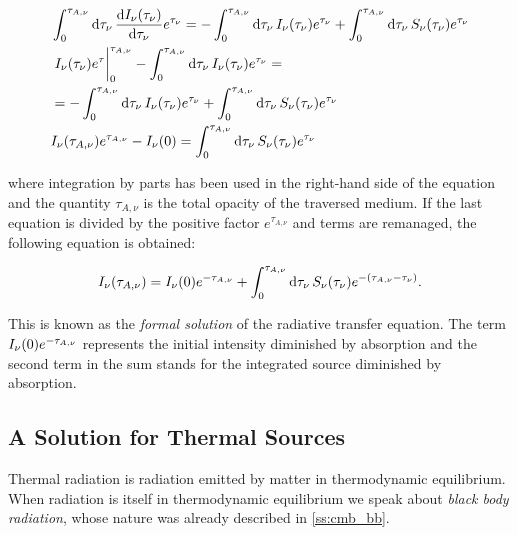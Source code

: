 \begin{equation}
        \begin{split}
                & \int^{\tau_{A,\nu}}_0 \dd{\tau_\nu}
                \dv{I_\nu\qty(\tau_\nu)}{\tau_\nu} e^{\tau_\nu} =
                -\int^{\tau_{A,\nu}}_0 \dd{\tau_\nu}
                I_\nu\qty(\tau_\nu) e^{\tau_\nu} +
                \int^{\tau_{A,\nu}}_0 \dd{\tau_\nu}
                S_\nu\qty(\tau_\nu) e^{\tau_\nu} \\
                & \eval{I_\nu\qty(\tau_\nu) e^\tau}^{\tau_{A,\nu}}_0
                -\int^{\tau_{A,\nu}}_0 \dd{\tau_\nu}
                I_\nu\qty(\tau_\nu) e^{\tau_\nu} = \\
                & = -\int^{\tau_{A,\nu}}_0 \dd{\tau_\nu}
                I_\nu\qty(\tau_\nu) e^{\tau_\nu} +
                \int^{\tau_{A,\nu}}_0 \dd{\tau_\nu}
                S_\nu\qty(\tau_\nu) e^{\tau_\nu} \\
                & I_\nu\qty(\tau_{A,\nu}) e^{\tau_{A,\nu}} -I_\nu\qty(0) =
                \int^{\tau_{A,\nu}}_0 \dd{\tau_\nu}
                S_\nu\qty(\tau_\nu) e^{\tau_\nu}
        \end{split}
\end{equation}

where integration by parts has been used in the right-hand side of the
equation and the quantity $\tau_{A,\nu}$ is the total opacity of the
traversed medium. If the last equation is divided by the positive factor
$e^{\tau_{A,\nu}}$ and terms are remanaged, the following equation is
obtained:

\begin{equation}
        I_\nu\qty(\tau_{A,\nu}) = I_\nu\qty(0) e^{-\tau_{A,\nu}} +
        \int^{\tau_{A,\nu}}_0 \dd{\tau_\nu}
        S_\nu\qty(\tau_\nu) e^{-\qty(\tau_{A,\nu} - \tau_\nu)}.
\end{equation}

This is known as the \emph{formal solution} of the radiative transfer
equation. The term $I_\nu\qty(0) e^{-\tau_{A,\nu}}$ represents the initial
intensity diminished by absorption and the second term in the sum stands
for the integrated source diminished by absorption.

\subsection{A Solution for Thermal Sources}

Thermal radiation is radiation emitted by matter in thermodynamic
equilibrium. When radiation is itself in thermodynamic equilibrium we
speak about \emph{black body radiation}, whose nature was already described
in \autoref{ss:cmb_bb}.

